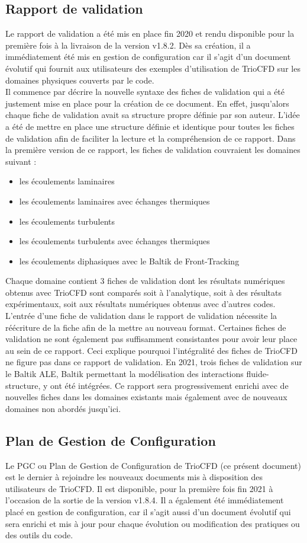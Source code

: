 \subsection{\label{subsec:validation}Rapport de validation}
Le rapport de validation a été mis en place fin 2020 et rendu disponible pour la première fois à la livraison de la version v1.8.2. Dès sa création, il a immédiatement été mis en gestion de configuration car il s'agit d'un document évolutif qui fournit aux utilisateurs des exemples d'utilisation de TrioCFD sur les domaines physiques couverts par le code.\\
Il commence par décrire la nouvelle syntaxe des fiches de validation qui a été justement mise en place pour la création de ce document. En effet, jusqu'alors chaque fiche de validation avait sa structure propre définie par son auteur. L'idée a été de mettre en place une structure définie et identique pour toutes les fiches de validation afin de faciliter la lecture et la compréhension de ce rapport. Dans la première version de ce rapport, les fiches de validation couvraient les domaines suivant :\
\begin{itemize}
   \item les écoulements laminaires
   \item les écoulements laminaires avec échanges thermiques
   \item les écoulements turbulents
   \item les écoulements turbulents avec échanges thermiques
   \item les écoulements diphasiques avec le Baltik de Front-Tracking
\end{itemize}
Chaque domaine contient 3 fiches de validation dont les résultats numériques obtenus avec TrioCFD sont comparés soit à l'analytique, soit à des résultats expérimentaux, soit aux résultats numériques obtenus avec d'autres codes. L'entrée d'une fiche de validation dans le rapport de validation nécessite la réécriture de la fiche afin de la mettre au nouveau format. Certaines fiches de validation ne sont également pas suffisamment consistantes pour avoir leur place au sein de ce rapport. Ceci explique pourquoi l'intégralité des fiches de TrioCFD ne figure pas dans ce rapport de validation.
En 2021, trois fiches de validation sur le Baltik ALE, Baltik permettant la modélisation des interactions fluide-structure, y ont été intégrées. Ce rapport sera progressivement enrichi avec de nouvelles fiches dans les domaines existants mais également avec de nouveaux domaines non abordés jusqu'ici.
\subsection{Plan de Gestion de Configuration}
Le PGC ou Plan de Gestion de Configuration de TrioCFD (ce présent document) est le dernier à rejoindre les nouveaux documents mis à disposition des utilisateurs de TrioCFD. Il est disponible, pour la première fois fin 2021 à l'occasion de la sortie de la version v1.8.4. Il a également été immédiatement placé en gestion de configuration, car il s'agit aussi d'un document évolutif qui sera enrichi et mis à jour pour chaque évolution ou modification des pratiques ou des outils du code.

